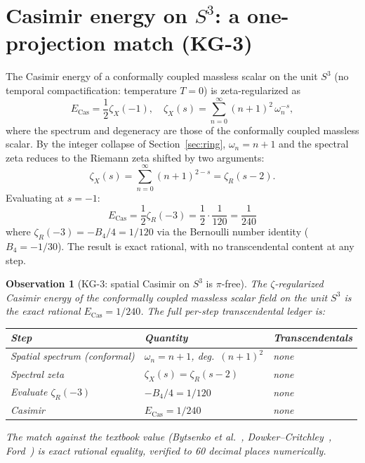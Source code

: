 \documentclass[11pt]{article}
\newtheorem{observation}{Observation}
\begin{document}
\section{Casimir energy on $S^3$: a one-projection match (KG-3)}
\label{sec:casimir}

The Casimir energy of a conformally coupled massless scalar on the unit
$S^3$ (no temporal compactification: temperature $T = 0$) is
zeta-regularized as
\begin{equation}
\label{eq:cas_def}
E_\text{Cas} = \frac{1}{2} \zeta_X(-1),
\quad \zeta_X(s) = \sum_{n=0}^\infty (n+1)^2 \, \omega_n^{-s},
\end{equation}
where the spectrum and degeneracy are those of the conformally coupled
massless scalar.  By the integer collapse of Section~\ref{sec:ring},
$\omega_n = n + 1$ and the spectral zeta reduces to the Riemann zeta
shifted by two arguments:
\begin{equation}
\zeta_X(s) = \sum_{n=0}^\infty (n+1)^{2-s} = \zeta_R(s - 2).
\end{equation}
Evaluating at $s = -1$:
\begin{equation}
\label{eq:cas_value}
E_\text{Cas} = \frac{1}{2} \zeta_R(-3) = \frac{1}{2} \cdot \frac{1}{120}
= \boxed{\frac{1}{240}}
\end{equation}
where $\zeta_R(-3) = -B_4 / 4 = 1/120$ via the Bernoulli number
identity ($B_4 = -1/30$).  The result is exact rational, with no
transcendental content at any step.

\begin{observation}[KG-3: spatial Casimir on $S^3$ is $\pi$-free]
\label{obs:casimir}
The $\zeta$-regularized Casimir energy of the conformally coupled
massless scalar field on the unit $S^3$ is the exact rational
$E_\text{Cas} = 1/240$.  The full per-step transcendental ledger is:
\begin{center}
\small
\begin{tabular}{p{5cm} p{4cm} p{2cm}}
\toprule
Step & Quantity & Transcendentals \\
\midrule
Spatial spectrum (conformal) & $\omega_n = n+1$, deg.\ $(n+1)^2$ &
none \\
Spectral zeta & $\zeta_X(s) = \zeta_R(s-2)$ & none \\
Evaluate $\zeta_R(-3)$ & $-B_4 / 4 = 1/120$ & none \\
Casimir & $E_\text{Cas} = 1/240$ & none \\
\bottomrule
\end{tabular}
\end{center}
The match against the textbook value (Bytsenko et al.~\cite{bytsenko},
Dowker--Critchley~\cite{dowker_critchley}, Ford~\cite{ford}) is exact
rational equality, verified to 60 decimal places numerically.
\end{observation}
\end{document}
